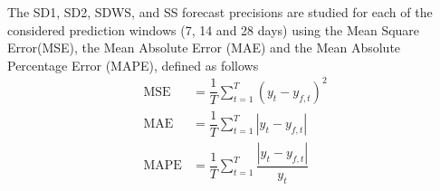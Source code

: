 The SD1, SD2, SDWS, and SS forecast precisions are studied for each of the considered prediction windows (7, 14 and 28 days) using the Mean Square Error(MSE), the Mean Absolute Error (MAE) and the Mean Absolute Percentage Error (MAPE), defined as follows
\begin{align*}
    \text{MSE} &= \dfrac{1}{T}\sum_{t=1}^{T} (y_t - y_{f,t})^2 \\
    \text{MAE} &= \dfrac{1}{T}\sum_{t=1}^{T}|y_t - y_{f,t}| \\
    \text{MAPE} &= \dfrac{1}{T}\sum_{t=1}^{T}\dfrac{|y_t - y_{f,t}|}{y_t} 
\end{align*}